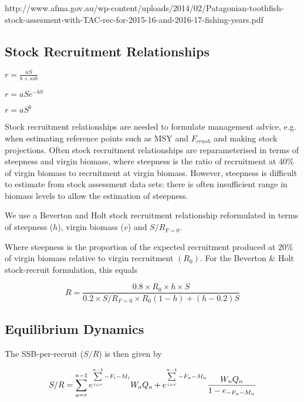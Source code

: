 \documentclass[]{article}
\begin{document}
\begin{itemize}
http://www.afma.gov.au/wp-content/uploads/2014/02/Patagonian-toothfish-stock-assesment-with-TAC-rec-for-2015-16-and-2016-17-fishing-years.pdf

\subsection{Stock Recruitment Relationships} 


$r = \frac{aS}{b + ssb}$ \citep{beverton1956review}

$r = aSe^{-bS}$ \citep{ricker_stock_1954}

$r=aS^b$ \citep{cushing1973dependence}


Stock recruitment relationships are needed to formulate management advice, e.g. when estimating reference points such as MSY and $F_{crash}$ and making stock projections. 
Often stock recruitment relationships are reparameterised in terms of steepness and virgin biomass, where steepness  
is the ratio of recruitment at 40\% of virgin biomass to recruitment at virgin biomass. However, steepness is difficult to estimate from  
stock assessment data sets: there is often insufficient range in biomass levels to allow the estimation of steepness. 
 
We use a Beverton and Holt stock recruitment relationship reformulated in terms of steepness ($h$), virgin biomass ($v$) and $S/R_{F=0}$. 
 
Where steepness is the proportion of the expected recruitment produced at 20\% of virgin biomass relative to virgin recruitment $(R_0)$. For the Beverton \& Holt  
stock-recruit formulation, this equals 
 
\begin{equation} 
R=\frac{0.8 \times R_0 \times h \times S}{0.2 \times S/R_{F=0} \times R_0(1-h)+(h-0.2)S} 
\end{equation}  


\subsection{Equilibrium Dynamics}\label{eql}

The SSB-per-recruit ($S/R$) is then given by 
 
\begin{equation} 
S/R=\sum\limits_{a=r}^{n-1} {e^{\sum\limits_{i=r}^{a-1} {-F_i-M_i}}} W_a Q_a + e^{\sum\limits_{i=r}^{n-1} {-F_n-M_n}} \frac{W_n Q_n}{1-e_{-F_n-M_n}}\\ 
\end{equation}  
 

\end{itemize}
\end{document}
